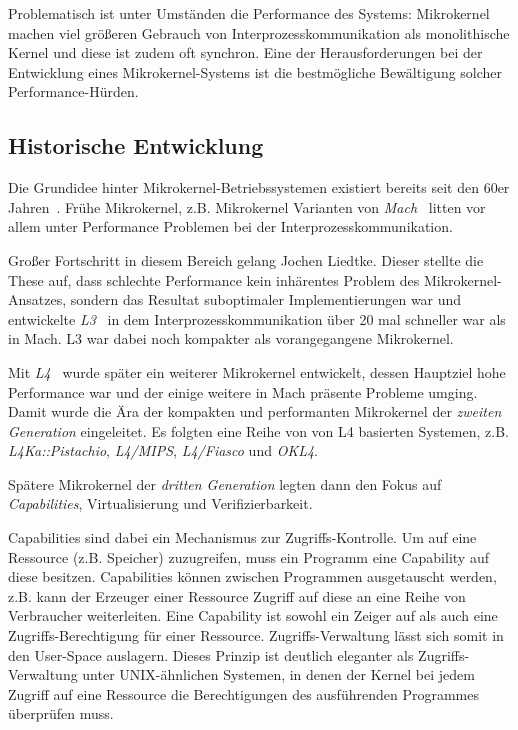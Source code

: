 Problematisch ist unter Umständen die Performance des Systems: Mikrokernel
machen viel größeren Gebrauch von Interprozesskommunikation als monolithische
Kernel und diese ist zudem oft synchron. Eine der Herausforderungen bei der
Entwicklung eines Mikrokernel-Systems ist die bestmögliche Bewältigung solcher
Performance-Hürden.

\subsection{Historische Entwicklung}

Die Grundidee hinter Mikrokernel-Betriebssystemen existiert bereits seit den
60er Jahren~\cite{rc4000}. Frühe Mikrokernel, z.B. Mikrokernel Varianten von
\textit{Mach}~\cite{mach} litten vor allem unter Performance Problemen bei der
Interprozesskommunikation.

Großer Fortschritt in diesem Bereich gelang Jochen Liedtke.  Dieser stellte die
These auf, dass schlechte Performance kein inhärentes Problem des
Mikrokernel-Ansatzes, sondern das Resultat suboptimaler Implementierungen war
und entwickelte \textit{L3}~\cite{l3} in dem Interprozesskommunikation über 20
mal schneller war als in Mach. L3 war dabei noch kompakter als vorangegangene
Mikrokernel.

Mit \textit{L4}~\cite{l4} wurde später ein weiterer Mikrokernel entwickelt,
dessen Hauptziel hohe Performance war und der einige weitere in Mach präsente
Probleme umging. Damit wurde die Ära der kompakten und performanten Mikrokernel
der \textit{zweiten Generation} eingeleitet. Es folgten eine Reihe von von L4
basierten Systemen, z.B. \textit{L4Ka::Pistachio}, \textit{L4/MIPS},
\textit{L4/Fiasco} und \textit{OKL4}.

Spätere Mikrokernel der \textit{dritten Generation} legten dann den Fokus auf
\textit{Capabilities}, Virtualisierung und Verifizierbarkeit.

Capabilities sind dabei ein Mechanismus zur Zugriffs-Kontrolle.  Um auf eine
Ressource (z.B. Speicher) zuzugreifen, muss ein Programm eine Capability auf
diese besitzen.  Capabilities können zwischen Programmen ausgetauscht werden,
z.B. kann der Erzeuger einer Ressource Zugriff auf diese an eine Reihe von
Verbraucher weiterleiten. Eine Capability ist sowohl ein Zeiger auf als auch eine
Zugriffs-Berechtigung für einer Ressource.  Zugriffs-Verwaltung lässt sich somit
in den User-Space auslagern. Dieses Prinzip ist deutlich eleganter als
Zugriffs-Verwaltung unter UNIX-ähnlichen Systemen, in denen der Kernel bei
jedem Zugriff auf eine Ressource die Berechtigungen des ausführenden Programmes
überprüfen muss.

